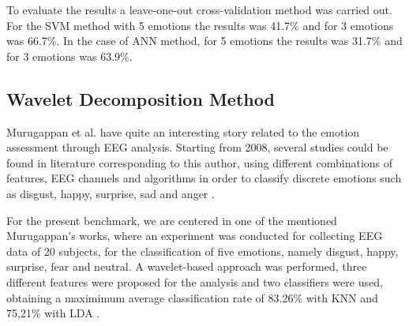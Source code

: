 \documentclass{sig-alternate}
\begin{document}
To evaluate the results a leave-one-out cross-validation method was carried out. 
For the SVM method with 5 emotions the results was 41.7\% and for 3 emotions was 66.7\%.
In the case of ANN method, for 5 emotions the results was 31.7\% and for 3 emotions was
63.9\%.   






\subsection{Wavelet Decomposition Method}	

Murugappan et al. have quite an interesting story related to the emotion assessment through EEG analysis. Starting from 2008, several studies could be found in literature corresponding to this author, using different combinations of features, EEG channels and algorithms in order to classify discrete emotions such as disgust, happy, surprise, sad and anger \cite{murugappan2008time,murugappan2009wavelet}.

For the present benchmark, we are centered in one of the mentioned Murugappan's works, where an experiment was conducted for collecting EEG data of 20 subjects, for the classification of five emotions, namely disgust, happy, surprise, fear and neutral. A wavelet-based approach was performed, three different features were proposed for the analysis and two classifiers were used, obtaining a maximimum average classification rate of 83.26\% with KNN and 75,21\% with LDA \cite{murugappan2010classification}.
\end{document}
